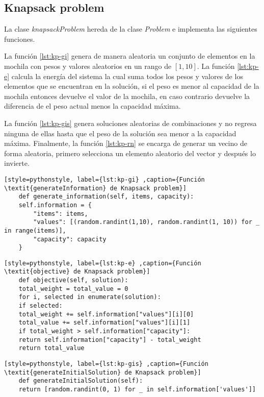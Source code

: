 \subsection{Knapsack problem}

La clase \textit{knapsackProblem} hereda de la clase \textit{Problem} e implementa las siguientes funciones.

La función \ref{lst:kp-gi} genera de manera aleatoria un conjunto de elementos en la mochila con pesos y valores aleatorios en un rango de $[1,10]$. La función \ref{lst:kp-e} calcula la energía del sistema la cual suma todos los pesos y valores de los elementos que se encuentran en la solución, si el peso es menor al capacidad de la mochila entonces devuelve el valor de la mochila, en caso contrario devuelve la diferencia de el peso actual menos la capacidad máxima.

La función \ref{lst:kp-gis} genera soluciones aleatorias de combinaciones y no regresa ninguna de ellas hasta que el peso de la solución sea menor a la capacidad máxima. Finalmente, la función \ref{lst:kp-rn} se encarga de generar un vecino de forma aleatoria, primero selecciona un elemento aleatorio del vector y después lo invierte.  

\begin{lstlisting}[style=pythonstyle, label={lst:kp-gi} ,caption={Función \textit{generateInformation} de Knapsack problem}]
	def generate_information(self, items, capacity):
	self.information = {
		"items": items,
		"values": [(random.randint(1,10), random.randint(1, 10)) for _ in range(items)],
		"capacity": capacity
	}
\end{lstlisting}

\begin{lstlisting}[style=pythonstyle, label={lst:kp-e} ,caption={Función \textit{objective} de Knapsack problem}]
	def objective(self, solution):
	total_weight = total_value = 0
	for i, selected in enumerate(solution):
	if selected:
	total_weight += self.information["values"][i][0]
	total_value += self.information["values"][i][1]
	if total_weight > self.information["capacity"]:
	return self.information["capacity"] - total_weight 
	return total_value
\end{lstlisting}

\begin{lstlisting}[style=pythonstyle, label={lst:kp-gis} ,caption={Función \textit{generateInitialSolution} de Knapsack problem}]
	def generateInitialSolution(self):
	return [random.randint(0, 1) for _ in self.information['values']]
\end{lstlisting}


